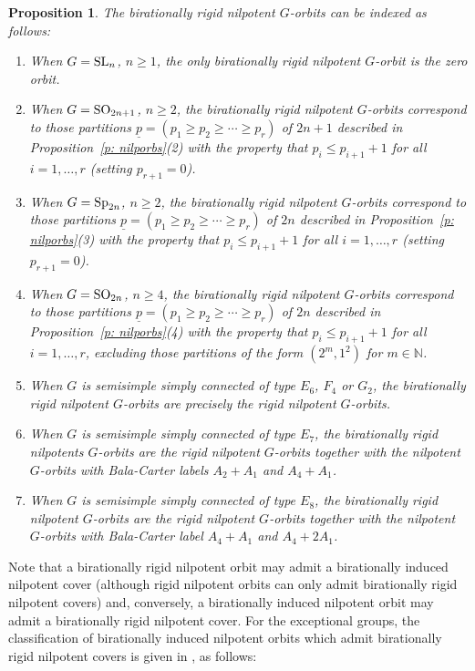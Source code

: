 \documentclass[11pt]{amsart}
\newcommand{\N}{{\mathbb N}}
\newcommand{\SL}{{{\mbox{\rm SL}}}}
\newcommand{\SO}{{{\mbox{\rm SO}}}}
\newcommand{\Sp}{{{\mbox{\rm Sp}}}}
\newtheorem{prop}[theorem]{Proposition}
\numberwithin{equation}{section}
\begin{document}
	\begin{prop}\label{p: birigid orbs}
		The birationally rigid nilpotent $G$-orbits can be indexed as follows:
		\begin{enumerate}
			\item When $G=\SL_n$, $n\geq 1$, the only birationally rigid nilpotent $G$-orbit is the zero orbit.
			\item When $G=\SO_{2n+1}$, $n\geq 2$, the birationally rigid nilpotent $G$-orbits correspond to those partitions $\underline{p}=(p_1\geq p_2\geq \cdots\geq p_r)$ of $2n+1$ described in Proposition~\ref{p: nilporbs}(2) with the property that $p_i\leq p_{i+1}+1$ for all $i=1,\ldots, r$ (setting $p_{r+1}=0$).
			\item When $G=\Sp_{2n}$, $n\geq 2$, the birationally rigid nilpotent $G$-orbits correspond to those partitions $\underline{p}=(p_1\geq p_2\geq \cdots\geq p_r)$ of $2n$ described in Proposition~\ref{p: nilporbs}(3) with the property that $p_i\leq p_{i+1}+1$ for all $i=1,\ldots, r$ (setting $p_{r+1}=0$).
			\item When $G=\SO_{2n}$, $n\geq 4$, the birationally rigid nilpotent $G$-orbits correspond to those partitions $\underline{p}=(p_1\geq p_2\geq \cdots\geq p_r)$ of $2n$ described in Proposition~\ref{p: nilporbs}(4) with the property that $p_i\leq p_{i+1}+1$ for all $i=1,\ldots, r$, excluding those partitions of the form $(2^m,1^2)$ for $m\in\N$.
			\item When $G$ is semisimple simply connected of type $E_6$, $F_4$ or $G_2$, the birationally rigid nilpotent $G$-orbits are precisely the rigid nilpotent $G$-orbits.
			\item When $G$ is semisimple simply connected of type $E_7$, the birationally rigid nilpotents $G$-orbits are the rigid nilpotent $G$-orbits together with the nilpotent $G$-orbits with Bala-Carter labels $A_2+A_1$ and $A_4+A_1$.
			\item When $G$ is semisimple simply connected of type $E_8$, the birationally rigid nilpotent $G$-orbits are the rigid nilpotent $G$-orbits together with the nilpotent $G$-orbits with Bala-Carter label $A_4+A_1$ and $A_4+2A_1$.
		\end{enumerate}
	\end{prop}
	
	Note that a birationally rigid nilpotent orbit may admit a birationally induced nilpotent cover (although rigid nilpotent orbits can only admit birationally rigid nilpotent covers) and, conversely, a birationally induced nilpotent orbit may admit a birationally rigid nilpotent cover. For the exceptional groups, the classification of birationally induced nilpotent orbits which admit birationally rigid nilpotent covers is given in \cite[Proposition 3.9.5]{MM}, as follows:
	
\end{document}
